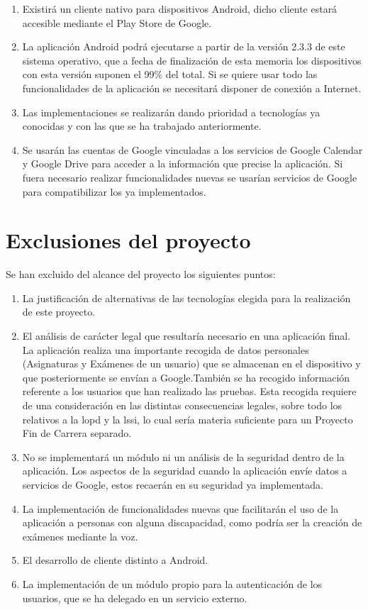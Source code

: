 \begin{enumerate}
	\item Existirá un cliente nativo para dispositivos Android, dicho cliente estará accesible mediante el Play Store de Google.
	\item La aplicación Android podrá ejecutarse a partir de la versión 2.3.3 de este sistema operativo, que a fecha de finalización de esta memoria los dispositivos con esta versión suponen el 99\% del total. Si se quiere usar todo las funcionalidades de la aplicación se necesitará disponer de conexión a Internet.
	\item Las implementaciones se realizarán dando prioridad a tecnologías ya conocidas y con las que se ha trabajado anteriormente.
	\item Se usarán las cuentas de Google vinculadas a los servicios de Google Calendar y Google Drive para acceder a la información que precise la aplicación. Si fuera necesario realizar funcionalidades nuevas se usarían servicios de Google para compatibilizar los ya implementados.
\end{enumerate}
\newpage
\section{Exclusiones del proyecto}
\label{secc:Exclusiones}

Se han excluido del alcance del proyecto los siguientes puntos:

\begin{enumerate}
	\item La justificación de alternativas de las tecnologías elegida para la realización de este proyecto. 
	\item El análisis de carácter legal que resultaría necesario en una aplicación final. La aplicación realiza una importante recogida de datos personales (Asignaturas y Exámenes de un usuario) que se almacenan en el dispositivo y que posteriormente se envían a Google.También se ha recogido información referente a los usuarios que han realizado las pruebas. Esta recogida requiere de una consideración en las distintas consecuencias legales, sobre todo los relativos a la \acrfull{lopd} y la \acrfull{lssi}, lo cual sería materia suficiente para un Proyecto Fin de Carrera separado.
	\item No se implementará un módulo ni un análisis de la seguridad dentro de la aplicación. Los aspectos de la seguridad cuando la aplicación envíe datos a servicios de Google, estos recaerán en su seguridad ya implementada.
	\item La implementación de funcionalidades nuevas que facilitarán el uso de la aplicación a personas con alguna discapacidad, como podría ser la creación de exámenes mediante la voz. 
	\item El desarrollo de cliente distinto a Android.
	\item La implementación de un módulo propio para la autenticación de los usuarios, que se ha delegado en un servicio externo.
\end{enumerate}

